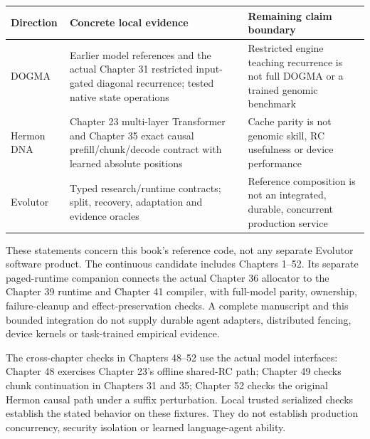 \begin{center}\small
\begin{tabular}{p{.19\linewidth}p{.37\linewidth}p{.33\linewidth}}
\toprule Direction & Concrete local evidence & Remaining claim boundary\\
\midrule
DOGMA & Earlier model references and the actual Chapter 31 restricted
input-gated diagonal recurrence; tested native state operations & Restricted
engine teaching recurrence is not full DOGMA or a trained genomic benchmark\\
Hermon DNA & Chapter 23 multi-layer Transformer and Chapter 35 exact causal
prefill/chunk/decode contract with learned absolute positions & Cache parity is
not genomic skill, RC usefulness or device performance\\
Evolutor & Typed research/runtime contracts; split, recovery,
adaptation and evidence oracles & Reference composition is not an integrated,
durable, concurrent production service\\
\bottomrule
\end{tabular}
\end{center}
These statements concern this book's reference code, not any separate Evolutor
software product. The continuous candidate includes Chapters 1--52. Its separate
paged-runtime companion connects the actual Chapter 36 allocator to the
Chapter 39 runtime and Chapter 41 compiler, with full-model parity, ownership,
failure-cleanup and effect-preservation checks. A complete manuscript and this
bounded integration do not supply durable agent adapters, distributed fencing,
device kernels or task-trained empirical evidence.

The cross-chapter checks in Chapters 48--52 use the actual model interfaces:
Chapter 48 exercises Chapter 23's offline shared-RC path; Chapter 49 checks
chunk continuation in Chapters 31 and 35; Chapter 52 checks the original
Hermon causal path under a suffix perturbation. Local trusted serialized
checks establish the stated behavior on these fixtures. They do not establish
production concurrency, security isolation or learned language-agent ability.


